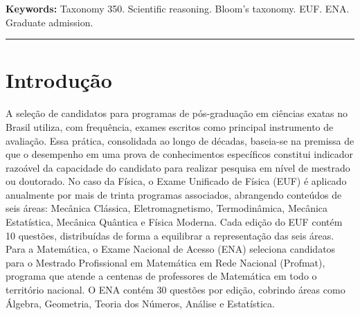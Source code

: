 \documentclass[
  12pt,
  a4paper,
  twoside,
  brazilian
]{article}
\begin{document}
\textbf{Keywords:} Taxonomy 350. Scientific reasoning. Bloom's taxonomy.
EUF. ENA. Graduate admission.

\begin{center}\rule{0.5\linewidth}{0.5pt}\end{center}

\section{Introdução}\label{introduuxe7uxe3o}

A seleção de candidatos para programas de pós-graduação em ciências
exatas no Brasil utiliza, com frequência, exames escritos como principal
instrumento de avaliação. Essa prática, consolidada ao longo de décadas,
baseia-se na premissa de que o desempenho em uma prova de conhecimentos
específicos constitui indicador razoável da capacidade do candidato para
realizar pesquisa em nível de mestrado ou doutorado. No caso da Física,
o Exame Unificado de Física (EUF) é aplicado anualmente por mais de
trinta programas associados, abrangendo conteúdos de seis áreas:
Mecânica Clássica, Eletromagnetismo, Termodinâmica, Mecânica
Estatística, Mecânica Quântica e Física Moderna. Cada edição do EUF
contém 10 questões, distribuídas de forma a equilibrar a representação
das seis áreas. Para a Matemática, o Exame Nacional de Acesso (ENA)
seleciona candidatos para o Mestrado Profissional em Matemática em Rede
Nacional (Profmat), programa que atende a centenas de professores de
Matemática em todo o território nacional. O ENA contém 30 questões por
edição, cobrindo áreas como Álgebra, Geometria, Teoria dos Números,
Análise e Estatística.
\end{document}

